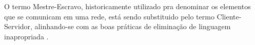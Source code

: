 O termo Mestre-Escravo, historicamente utilizado pra denominar os elementos que se comunicam em uma rede, 
está sendo substituido pelo termo Cliente-Servidor, 
alinhando-se com as boas práticas de eliminação de linguagem inapropriada  \cite{client_server}.


















